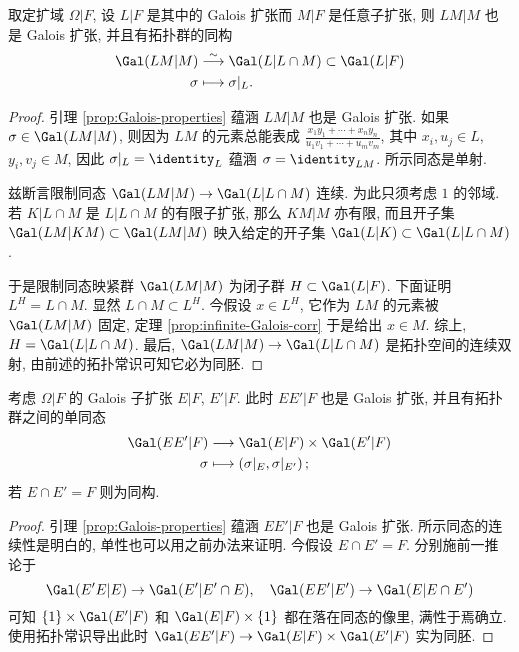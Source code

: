\begin{corollary}[基变换]\label{prop:Galois-group-basechange}
	取定扩域 $\Omega|F$, 设 $L|F$ 是其中的 Galois 扩张而 $M|F$ 是任意子扩张, 则 $LM|M$ 也是 Galois 扩张, 并且有拓扑群的同构
	\begin{align*}
		\Gal(LM|M) & \stackrel{\sim}{\longrightarrow} \Gal(L|L \cap M) \subset \Gal(L|F) \\
		\sigma & \longmapsto \sigma|_L.
	\end{align*}
\end{corollary}
\begin{proof}
	引理 \ref{prop:Galois-properties} 蕴涵 $LM|M$ 也是 Galois 扩张. 如果 $\sigma \in \Gal(LM|M)$, 则因为 $LM$ 的元素总能表成 $\frac{x_1 y_1 + \cdots + x_n y_n}{u_1 v_1 + \cdots + u_m v_m}$, 其中 $x_i, u_j \in L$, $y_i, v_j \in M$, 因此 $\sigma|_L = \identity_L$ 蕴涵 $\sigma = \identity_{LM}$. 所示同态是单射.

	兹断言限制同态 $\Gal(LM|M) \to \Gal(L|L \cap M)$ 连续. 为此只须考虑 $1$ 的邻域. 若 $K|L \cap M$ 是 $L|L \cap M$ 的有限子扩张, 那么 $KM|M$ 亦有限, 而且开子集 $\Gal(LM|KM) \subset \Gal(LM|M)$ 映入给定的开子集 $\Gal(L|K) \subset \Gal(L|L \cap M)$.

	于是限制同态映紧群 $\Gal(LM|M)$ 为闭子群 $H \subset \Gal(L|F)$. 下面证明 $L^H = L \cap M$. 显然 $L \cap M \subset L^H$. 今假设 $x \in L^H$, 它作为 $LM$ 的元素被 $\Gal(LM|M)$ 固定, 定理 \ref{prop:infinite-Galois-corr} 于是给出 $x \in M$. 综上, $H = \Gal(L|L \cap M)$. 最后, $\Gal(LM|M) \to \Gal(L|L \cap M)$ 是拓扑空间的连续双射, 由前述的拓扑常识可知它必为同胚.
\end{proof}

\begin{corollary}\label{prop:Galois-group-compositum}
	考虑 $\Omega|F$ 的 Galois 子扩张 $E|F$, $E'|F$. 此时 $EE'|F$ 也是 Galois 扩张, 并且有拓扑群之间的单同态
	\begin{align*}
		\Gal(EE'|F) & \longrightarrow \Gal(E|F) \times \Gal(E'|F) \\
		\sigma & \longmapsto \left( \sigma|_E, \sigma|_{E'} \right);
	\end{align*}
	若 $E \cap E' = F$ 则为同构.
\end{corollary}
\begin{proof}
	引理 \ref{prop:Galois-properties} 蕴涵 $EE'|F$ 也是 Galois 扩张. 所示同态的连续性是明白的, 单性也可以用之前办法来证明. 今假设 $E \cap E' = F$. 分别施前一推论于
	\[ \Gal(E'E|E) \to \Gal(E'| E' \cap E), \quad \Gal(EE'|E') \to \Gal(E | E \cap E') \]
	可知 $\{1\} \times \Gal(E'|F)$ 和 $\Gal(E|F) \times \{1\}$ 都在落在同态的像里, 满性于焉确立. 使用拓扑常识导出此时 $\Gal(EE'|F) \to \Gal(E|F) \times \Gal(E'|F)$ 实为同胚.
\end{proof}

